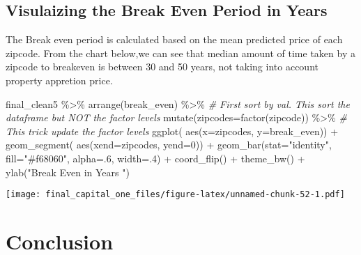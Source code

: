 \documentclass[
]{article}
\newenvironment{Shaded}{\begin{snugshade}}{\end{snugshade}}
\newcommand{\AttributeTok}[1]{\textcolor[rgb]{0.77,0.63,0.00}{#1}}
\newcommand{\CommentTok}[1]{\textcolor[rgb]{0.56,0.35,0.01}{\textit{#1}}}
\newcommand{\DecValTok}[1]{\textcolor[rgb]{0.00,0.00,0.81}{#1}}
\newcommand{\FunctionTok}[1]{\textcolor[rgb]{0.00,0.00,0.00}{#1}}
\newcommand{\NormalTok}[1]{#1}
\newcommand{\SpecialCharTok}[1]{\textcolor[rgb]{0.00,0.00,0.00}{#1}}
\newcommand{\StringTok}[1]{\textcolor[rgb]{0.31,0.60,0.02}{#1}}
\begin{document}
\hypertarget{visulaizing-the-break-even-period-in-years}{%
\subsection{Visulaizing the Break Even Period in
Years}\label{visulaizing-the-break-even-period-in-years}}

The Break even period is calculated based on the mean predicted price of
each zipcode. From the chart below,we can see that median amount of time
taken by a zipcode to breakeven is between 30 and 50 years, not taking
into account property appretion price.

\begin{Shaded}
\begin{Highlighting}[]
\NormalTok{final\_clean5 }\SpecialCharTok{\%\textgreater{}\%}
  \FunctionTok{arrange}\NormalTok{(break\_even) }\SpecialCharTok{\%\textgreater{}\%}    \CommentTok{\# First sort by val. This sort the dataframe but NOT the factor levels}
  \FunctionTok{mutate}\NormalTok{(}\AttributeTok{zipcodes=}\FunctionTok{factor}\NormalTok{(zipcode)) }\SpecialCharTok{\%\textgreater{}\%}   \CommentTok{\# This trick update the factor levels}
  \FunctionTok{ggplot}\NormalTok{( }\FunctionTok{aes}\NormalTok{(}\AttributeTok{x=}\NormalTok{zipcodes, }\AttributeTok{y=}\NormalTok{break\_even)) }\SpecialCharTok{+}
    \FunctionTok{geom\_segment}\NormalTok{( }\FunctionTok{aes}\NormalTok{(}\AttributeTok{xend=}\NormalTok{zipcodes, }\AttributeTok{yend=}\DecValTok{0}\NormalTok{)) }\SpecialCharTok{+}
    \FunctionTok{geom\_bar}\NormalTok{(}\AttributeTok{stat=}\StringTok{"identity"}\NormalTok{, }\AttributeTok{fill=}\StringTok{"\#f68060"}\NormalTok{, }\AttributeTok{alpha=}\NormalTok{.}\DecValTok{6}\NormalTok{, }\AttributeTok{width=}\NormalTok{.}\DecValTok{4}\NormalTok{) }\SpecialCharTok{+}
    \FunctionTok{coord\_flip}\NormalTok{() }\SpecialCharTok{+}
    \FunctionTok{theme\_bw}\NormalTok{() }\SpecialCharTok{+}
    \FunctionTok{ylab}\NormalTok{(}\StringTok{"Break Even in Years "}\NormalTok{)}
\end{Highlighting}
\end{Shaded}

\texttt{[image: final\_capital\_one\_files/figure-latex/unnamed-chunk-52-1.pdf]}

\hypertarget{conclusion}{%
\section{Conclusion}\label{conclusion}}
\end{document}
